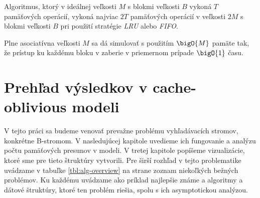\begin{lema}
Algoritmus, ktorý v ideálnej \cache veľkosti $M$ s blokmi veľkosti $B$ vykoná $T$ pamäťových operácií, vykoná najviac $2T$ pamäťových operácií v \cache veľkosti $2M$ s blokmi veľkosti $B$ pri použití stratégie \emph{LRU} alebo \emph{FIFO}. \citep[Lemma 12]{frigo1999cache}
\end{lema}

\begin{lema}
Plne asociatívna \cache veľkosti $M$ sa dá simulovať s použitím $\bigO{M}$ pamäte tak, že prístup ku každému bloku v \cache zaberie v priemernom prípade $\bigO{1}$ času. \citep[Lemma 16]{frigo1999cache}
\end{lema}

\section{Prehľad výsledkov v cache-oblivious modeli}

V tejto práci sa budeme venovať prevažne problému vyhľadávacích stromov, konkrétne B-stromom. V nasledujúcej kapitole uvedieme ich fungovanie a analýzu počtu pamäťových presunov v \extmem modeli. V tretej kapitole popíšeme vizualizácie, ktoré sme pre tieto štruktúry vytvorili. Pre širší rozhľad v tejto problematike uvádzame v tabuľke \ref{tbl:alg-overview} na strane \pageref{tbl:alg-overview} zoznam niekoľkých bežných problémov. Ku každému uvádzame ako príklad najlepšie známe \aware a \obliv algoritmy a dátové štruktúry, ktoré ten problém riešia, spolu s ich asymptotickou analýzou.

